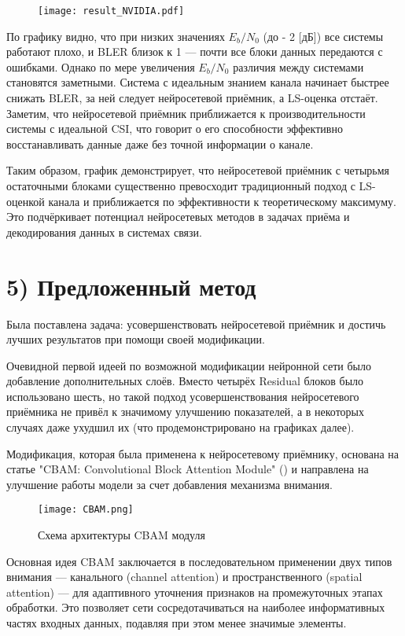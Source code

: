 \documentclass{article}
\begin{document}
\begin{figure}[H]
    \texttt{[image: result\_NVIDIA.pdf]}
\end{figure}


По графику видно, что при низких значениях $E_b/N_0$ (до - 2 [дБ]) все системы работают плохо, и BLER близок к 1 — почти все блоки данных передаются с ошибками. Однако по мере увеличения $E_b/N_0$ различия между системами становятся заметными. Система с идеальным знанием канала начинает быстрее снижать BLER, за ней следует нейросетевой приёмник, а LS-оценка отстаёт. Заметим, что нейросетевой приёмник приближается к производительности системы с идеальной CSI, что говорит о его способности эффективно восстанавливать данные даже без точной информации о канале.

Таким образом, график демонстрирует, что нейросетевой приёмник с четырьмя остаточными блоками существенно превосходит традиционный подход с LS-оценкой канала и приближается по эффективности к теоретическому максимуму. Это подчёркивает потенциал нейросетевых методов в задачах приёма и декодирования данных в системах связи.

\section*{5) Предложенный метод}

Была поставлена задача: усовершенствовать нейросетевой приёмник и достичь лучших результатов при помощи своей модификации. 

Очевидной первой идеей по возможной модификации нейронной сети было добавление дополнительных слоёв. Вместо четырёх Residual блоков было использовано шесть, но такой подход усовершенствования нейросетевого приёмника не привёл к значимому улучшению показателей, а в некоторых случаях даже ухудшил их (что продемонстрировано на графиках далее).

Модификация, которая была применена к нейросетевому приёмнику, основана на статье "CBAM: Convolutional Block Attention Module" (\citet{woo2018cbam}) и направлена на улучшение работы модели за счет добавления механизма внимания.

\begin{figure}[H]
    \centering \texttt{[image: CBAM.png]}
    \caption{Схема архитектуры CBAM модуля} 
    \label{fig:cbam} 
\end{figure}

Основная идея CBAM заключается в последовательном применении двух типов внимания — канального (channel attention) и пространственного (spatial attention) — для адаптивного уточнения признаков на промежуточных этапах обработки. Это позволяет сети сосредотачиваться на наиболее информативных частях входных данных, подавляя при этом менее значимые элементы.
\end{document}
